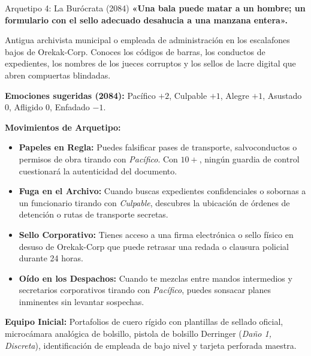 \begin{FichaArquetipo}{Arquetipo 4: La Burócrata (2084)}
\textbf{«Una bala puede matar a un hombre; un formulario con el sello adecuado desahucia a una manzana entera».}

Antigua archivista municipal o empleada de administración en los escalafones bajos de Orekak-Corp. Conoces los códigos de barras, los conductos de expedientes, los nombres de los jueces corruptos y los sellos de lacre digital que abren compuertas blindadas.

\textbf{Emociones sugeridas (2084):} Pacífico $+2$, Culpable $+1$, Alegre $+1$, Asustado $0$, Afligido $0$, Enfadado $-1$.

\textbf{Movimientos de Arquetipo:}
\begin{itemize}
    \item \textbf{Papeles en Regla:} Puedes falsificar pases de transporte, salvoconductos o permisos de obra tirando con \textit{Pacífico}. Con $10+$, ningún guardia de control cuestionará la autenticidad del documento.
    \item \textbf{Fuga en el Archivo:} Cuando buscas expedientes confidenciales o sobornas a un funcionario tirando con \textit{Culpable}, descubres la ubicación de órdenes de detención o rutas de transporte secretas.
    \item \textbf{Sello Corporativo:} Tienes acceso a una firma electrónica o sello físico en desuso de Orekak-Corp que puede retrasar una redada o clausura policial durante 24 horas.
    \item \textbf{Oído en los Despachos:} Cuando te mezclas entre mandos intermedios y secretarios corporativos tirando con \textit{Pacífico}, puedes sonsacar planes inminentes sin levantar sospechas.
\end{itemize}

\textbf{Equipo Inicial:} Portafolios de cuero rígido con plantillas de sellado oficial, microcámara analógica de bolsillo, pistola de bolsillo Derringer (\textit{Daño 1, Discreta}), identificación de empleada de bajo nivel y tarjeta perforada maestra.
\end{FichaArquetipo}

\vspace{1em}

